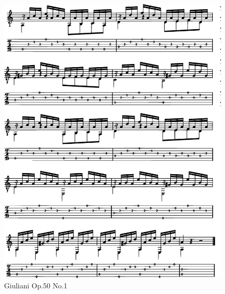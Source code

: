 \begin{figure}[h]
    \centering
    \includegraphics[width=1.0\textwidth]{Figures/Giu.eps}
    \caption{Giuliani Op.50 No.1}
    \label{fig:result-giu}
\end{figure}

